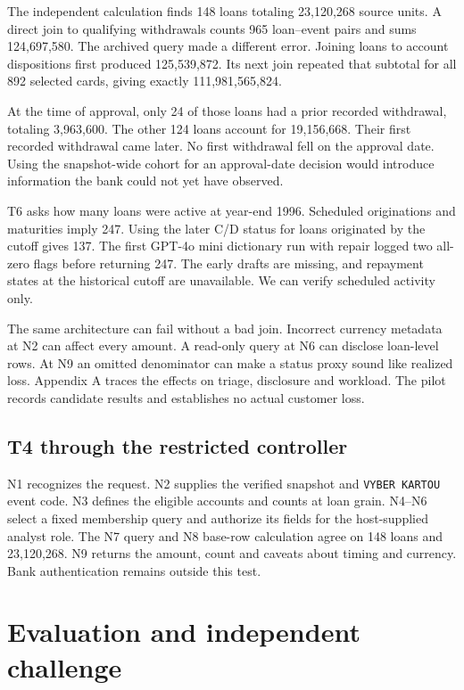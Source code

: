 \documentclass[11pt,a4paper,onecolumn,oneside]{rho-class/rho}
\begin{document}
The independent calculation finds 148 loans totaling 23,120,268 source units. A direct join to qualifying withdrawals counts 965 loan--event pairs and sums 124,697,580. The archived query made a different error. Joining loans to account dispositions first produced 125,539,872. Its next join repeated that subtotal for all 892 selected cards, giving exactly 111,981,565,824.

At the time of approval, only 24 of those loans had a prior recorded withdrawal, totaling 3,963,600. The other 124 loans account for 19,156,668. Their first recorded withdrawal came later. No first withdrawal fell on the approval date. Using the snapshot-wide cohort for an approval-date decision would introduce information the bank could not yet have observed.

T6 asks how many loans were active at year-end 1996. Scheduled originations and maturities imply 247. Using the later C/D status for loans originated by the cutoff gives 137. The first GPT-4o mini dictionary run with repair logged two all-zero flags before returning 247. The early drafts are missing, and repayment states at the historical cutoff are unavailable. We can verify scheduled activity only.

The same architecture can fail without a bad join. Incorrect currency metadata at N2 can affect every amount. A read-only query at N6 can disclose loan-level rows. At N9 an omitted denominator can make a status proxy sound like realized loss. Appendix A traces the effects on triage, disclosure and workload. The pilot records candidate results and establishes no actual customer loss.

\subsection{T4 through the restricted controller}
N1 recognizes the request. N2 supplies the verified snapshot and \texttt{VYBER~KARTOU} event code. N3 defines the eligible accounts and counts at loan grain. N4--N6 select a fixed membership query and authorize its fields for the host-supplied analyst role. The N7 query and N8 base-row calculation agree on 148 loans and 23,120,268. N9 returns the amount, count and caveats about timing and currency. Bank authentication remains outside this test.

\clearpage

\section{Evaluation and independent challenge}
\end{document}
